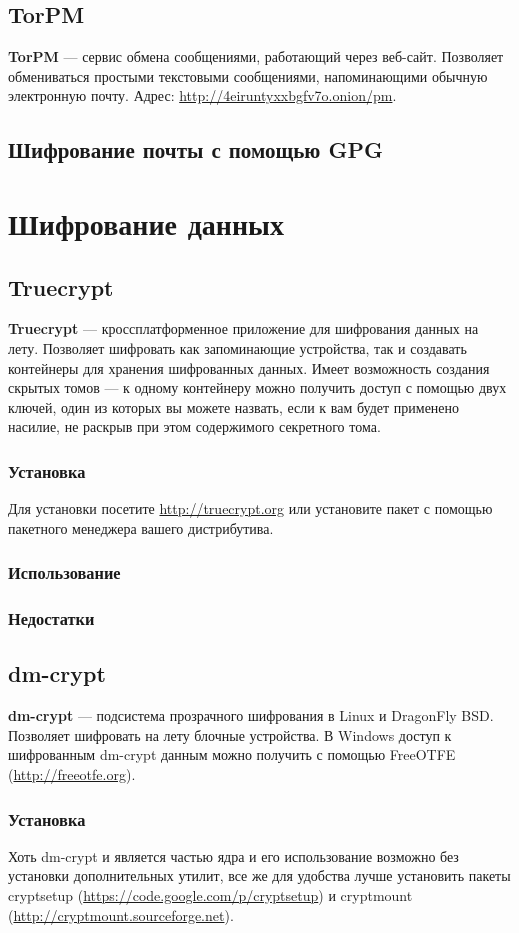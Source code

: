 \begin{enumerate}
\subsection{TorPM}
\textbf{TorPM} --- сервис обмена сообщениями, работающий через веб-сайт. Позволяет обмениваться простыми текстовыми сообщениями, напоминающими обычную электронную почту. Адрес: \url{http://4eiruntyxxbgfv7o.onion/pm}.
\subsection{Шифрование почты с помощью GPG}

\section{Шифрование данных}
\subsection{Truecrypt}
\textbf{Truecrypt} --- кроссплатформенное приложение для шифрования данных на лету. Позволяет шифровать как запоминающие устройства, так и создавать контейнеры для хранения шифрованных данных. Имеет возможность создания скрытых томов --- к одному контейнеру можно получить доступ с помощью двух ключей, один из которых вы можете назвать, если к вам будет применено насилие, не раскрыв при этом содержимого секретного тома.
\subsubsection{Установка}
Для установки посетите \url{http://truecrypt.org} или установите пакет с помощью пакетного менеджера вашего дистрибутива.
\subsubsection{Использование}
\subsubsection{Недостатки}
\subsection{dm-crypt}
\textbf{dm-crypt} --- подсистема прозрачного шифрования в Linux и DragonFly BSD. Позволяет шифровать на лету блочные устройства. В Windows доступ к шифрованным dm-crypt данным можно получить с помощью FreeOTFE (\url{http://freeotfe.org}).
\subsubsection{Установка}
Хоть dm-crypt и является частью ядра и его использование возможно без установки дополнительных утилит, все же для удобства лучше установить пакеты cryptsetup (\url{https://code.google.com/p/cryptsetup}) и cryptmount (\url{http://cryptmount.sourceforge.net}).

\end{enumerate}
